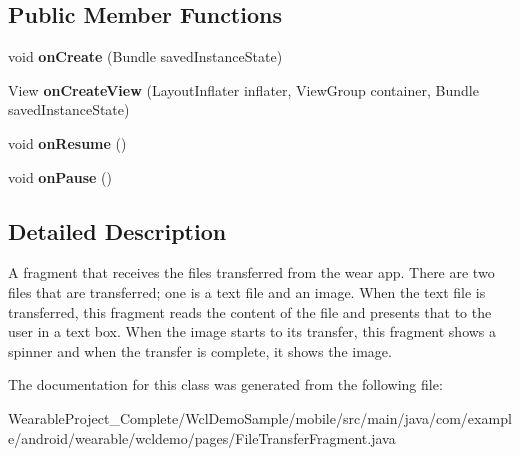 \subsection*{Public Member Functions}
\begin{DoxyCompactItemize}
\item 
void {\bfseries on\+Create} (Bundle saved\+Instance\+State)\hypertarget{classcom_1_1example_1_1android_1_1wearable_1_1wcldemo_1_1pages_1_1FileTransferFragment_a3eb75e1a4482def8fadd653bbf3bc5ab}{}\label{classcom_1_1example_1_1android_1_1wearable_1_1wcldemo_1_1pages_1_1FileTransferFragment_a3eb75e1a4482def8fadd653bbf3bc5ab}

\item 
View {\bfseries on\+Create\+View} (Layout\+Inflater inflater, View\+Group container, Bundle saved\+Instance\+State)\hypertarget{classcom_1_1example_1_1android_1_1wearable_1_1wcldemo_1_1pages_1_1FileTransferFragment_a7b2e65ce50aa3cf0bd24f36eb15df15c}{}\label{classcom_1_1example_1_1android_1_1wearable_1_1wcldemo_1_1pages_1_1FileTransferFragment_a7b2e65ce50aa3cf0bd24f36eb15df15c}

\item 
void {\bfseries on\+Resume} ()\hypertarget{classcom_1_1example_1_1android_1_1wearable_1_1wcldemo_1_1pages_1_1FileTransferFragment_a889cb648d1f627c58d4da1883cd9e507}{}\label{classcom_1_1example_1_1android_1_1wearable_1_1wcldemo_1_1pages_1_1FileTransferFragment_a889cb648d1f627c58d4da1883cd9e507}

\item 
void {\bfseries on\+Pause} ()\hypertarget{classcom_1_1example_1_1android_1_1wearable_1_1wcldemo_1_1pages_1_1FileTransferFragment_a67be1849e5e3bdc263f37c2f1033a881}{}\label{classcom_1_1example_1_1android_1_1wearable_1_1wcldemo_1_1pages_1_1FileTransferFragment_a67be1849e5e3bdc263f37c2f1033a881}

\end{DoxyCompactItemize}


\subsection{Detailed Description}
A fragment that receives the files transferred from the wear app. There are two files that are transferred; one is a text file and an image. When the text file is transferred, this fragment reads the content of the file and presents that to the user in a text box. When the image starts to its transfer, this fragment shows a spinner and when the transfer is complete, it shows the image. 

The documentation for this class was generated from the following file\+:\begin{DoxyCompactItemize}
\item 
Wearable\+Project\+\_\+\+Complete/\+Wcl\+Demo\+Sample/mobile/src/main/java/com/example/android/wearable/wcldemo/pages/File\+Transfer\+Fragment.\+java\end{DoxyCompactItemize}
